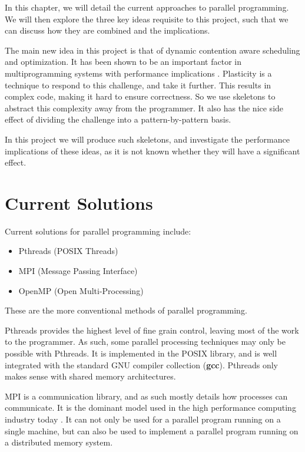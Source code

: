 
In this chapter, we will detail the current approaches to parallel programming. We will then explore the three key ideas requisite to this project, such that we can discuss how they are combined and the implications.

The main new idea in this project is that of dynamic contention aware scheduling and optimization. It has been shown to be an important factor in multiprogramming systems with performance implications \cite{lira}. Plasticity is a technique to respond to this challenge, and take it further. This results in complex code, making it hard to ensure correctness. So we use skeletons to abstract this complexity away from the programmer. It also has the nice side effect of dividing the challenge into a pattern-by-pattern basis.

In this project we will produce such skeletons, and investigate the performance implications of these ideas, as it is not known whether they will have a significant effect.



\section{Current Solutions}

Current solutions for parallel programming include:

\begin{itemize}
	\item Pthreads (POSIX Threads)
	\item MPI 	   (Message Passing Interface)
	\item OpenMP   (Open Multi-Processing)
\end{itemize}

These are the more conventional methods of parallel programming.

Pthreads provides the highest level of fine grain control, leaving most of the work to the programmer. As such, some parallel processing techniques may only be possible with Pthreads. It is implemented in the POSIX library, and is well integrated with the standard GNU compiler collection (\textbf{gcc}). Pthreads only makes sense with shared memory architectures.

MPI is a communication library, and as such mostly details how processes can communicate. It is the dominant model used in the high performance computing industry today \cite{mpi}. It can not only be used for a parallel program running on a single machine, but can also be used to implement a parallel program running on a distributed memory system.

